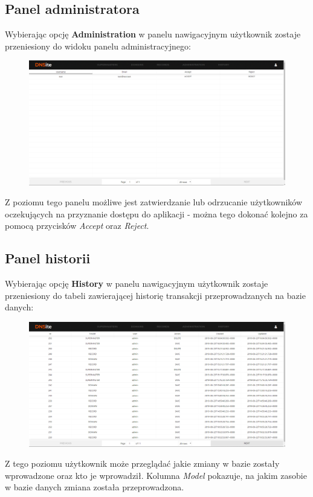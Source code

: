 \documentclass[12pt] {article}
\begin{document}
\subsection{Panel administratora}
Wybierając opcję \textbf{Administration} w panelu nawigacyjnym użytkownik zostaje przeniesiony do widoku panelu administracyjnego:
\begin{figure}[H]
\centering
\includegraphics[width=\textwidth]{res/x_panel_administracyjny}
\end{figure}
Z poziomu tego panelu możliwe jest zatwierdzanie lub odrzucanie użytkowników oczekujących na przyznanie dostępu do aplikacji - można tego dokonać kolejno za pomocą przycisków \emph{Accept} oraz \emph{Reject}. 

\subsection{Panel historii}
Wybierając opcję \textbf{History} w panelu nawigacyjnym użytkownik zostaje przeniesiony do tabeli zawierającej historię transakcji przeprowadzanych na bazie danych:
\begin{figure}[H]
\centering
\includegraphics[width=\textwidth]{res/x_historia}
\end{figure}
Z tego poziomu użytkownik może przeglądać jakie zmiany w bazie zostały wprowadzone oraz kto je wprowadził. Kolumna \emph{Model} pokazuje, na jakim zasobie w bazie danych zmiana została przeprowadzona. 
\end{document}
